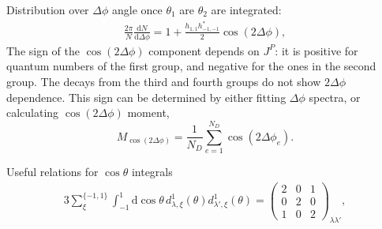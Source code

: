 \documentclass[prd,preprintnumbers,floatfix,
nofootinbib,superscriptaddress]{revtex4}
\newcommand{\diff}{\mathrm{d}}
\begin{document}
%

Distribution over $\Delta\phi$ angle once $\theta_1$ are $\theta_2$ are integrated:
\begin{align}
  \frac{2\pi}{N}\frac{\diff N}{\diff \Delta\phi} = 1
   + \frac{h_{1,1} h_{-1,-1}^*}{2} \cos(2 \Delta\phi),
\end{align}
The sign of the $\cos(2\Delta\phi)$ component depends on $J^P$: it is positive for quantum numbers of the first group, and negative for the ones in the second group.
The decays from the third and fourth groups do not show $2\Delta\phi$ dependence.
This sign can be determined by either fitting $\Delta\phi$ spectra, or calculating $\cos(2\Delta\phi)$ moment,
\begin{equation}
  M_{\cos(2\Delta\phi)} = \frac{1}{N_D}\sum_{e=1}^{N_D} \cos(2\Delta\phi_e).
\end{equation}

Useful relations for $\cos\theta$ integrals
\begin{align}
  3 \sum_{\xi}^{\{-1,1\}} \int_{-1}^{1} \diff \cos\theta\, d_{\lambda,\xi}^{1}(\theta) d_{\lambda',\xi}^{1}(\theta) =
  \begin{pmatrix}2 & 0 & 1\\0 & 2 & 0\\1 & 0 & 2\end{pmatrix}_{\lambda\lambda'},\\
\end{align}


%
\end{document}
